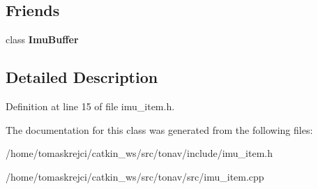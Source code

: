 \subsection*{Friends}
\begin{DoxyCompactItemize}
\item 
\hypertarget{class_imu_item_affcdaeabb9b33248d9efdf687f2eab5c}{class {\bfseries Imu\-Buffer}}\label{class_imu_item_affcdaeabb9b33248d9efdf687f2eab5c}

\end{DoxyCompactItemize}


\subsection{Detailed Description}


Definition at line 15 of file imu\-\_\-item.\-h.



The documentation for this class was generated from the following files\-:\begin{DoxyCompactItemize}
\item 
/home/tomaskrejci/catkin\-\_\-ws/src/tonav/include/imu\-\_\-item.\-h\item 
/home/tomaskrejci/catkin\-\_\-ws/src/tonav/src/imu\-\_\-item.\-cpp\end{DoxyCompactItemize}
